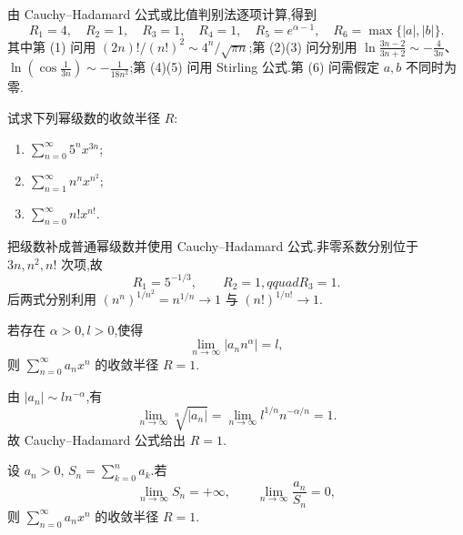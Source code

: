 \begin{solution}
    由 Cauchy--Hadamard 公式或比值判别法逐项计算,得到
    \[
        R_1=4,\quad R_2=1,\quad R_3=1,\quad R_4=1,
        \quad R_5=e^{\alpha-1},\quad R_6=\max\{|a|,|b|\}.
    \]
    其中第 (1) 问用 $(2n)!/(n!)^2\sim4^n/\sqrt{\pi n}$;第 (2)(3) 问分别用
    $\ln\frac{3n-2}{3n+2}\sim-\frac{4}{3n}$、$\ln(\cos\frac{1}{3n})\sim-\frac{1}{18n^2}$;第 (4)(5) 问用 Stirling 公式.第 (6) 问需假定 $a,b$ 不同时为零.
\end{solution}

\begin{example}
    试求下列幂级数的收敛半径 $R$:
    \begin{enumerate}
        \item $\displaystyle\sum\limits_{n=0}^{\infty}5^n x^{3n}$;
        \item $\displaystyle\sum\limits_{n=1}^{\infty}n^n x^{n^2}$;
        \item $\displaystyle\sum\limits_{n=0}^{\infty}n!x^{n!}$.
    \end{enumerate}
\end{example}
\exampleblank

\begin{solution}
    把级数补成普通幂级数并使用 Cauchy--Hadamard 公式.非零系数分别位于 $3n,n^2,n!$ 次项,故
    \[
        R_1=5^{-1/3},\qquad R_2=1,qquad R_3=1.
    \]
    后两式分别利用 $(n^n)^{1/n^2}=n^{1/n}\to1$ 与 $(n!)^{1/n!}\to1$.
\end{solution}

\begin{example}
    若存在 $\alpha>0,l>0$,使得
    \[
        \lim\limits_{n\to\infty}|a_nn^\alpha|=l,
    \]
    则 $\displaystyle\sum\limits_{n=0}^{\infty}a_nx^n$ 的收敛半径 $R=1$.
\end{example}
\exampleblank

\begin{solution}
    由 $|a_n|\sim l n^{-\alpha}$,有
    \[
        \lim\limits_{n\to\infty}\sqrt[n]{|a_n|}
        =\lim\limits_{n\to\infty}l^{1/n}n^{-\alpha/n}=1.
    \]
    故 Cauchy--Hadamard 公式给出 $R=1$.
\end{solution}

\begin{example}
    设 $a_n>0$, $S_n=\displaystyle\sum\limits_{k=0}^{n}a_k$.若
    \[
        \lim\limits_{n\to\infty}S_n=+\infty,
        \qquad
        \lim\limits_{n\to\infty}\dfrac{a_n}{S_n}=0,
    \]
    则 $\displaystyle\sum\limits_{n=0}^{\infty}a_nx^n$ 的收敛半径 $R=1$.
\end{example}
\exampleblank

